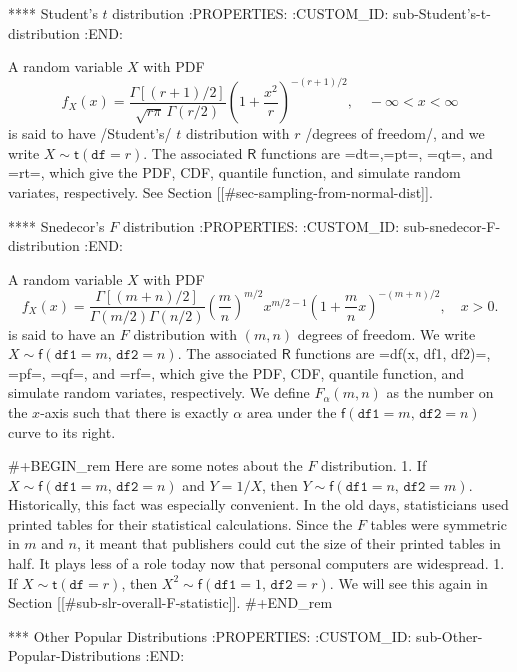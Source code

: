 **** Student's \(t\) distribution
:PROPERTIES:
:CUSTOM_ID: sub-Student's-t-distribution
:END:

A random variable \(X\) with PDF
\begin{equation}
f_{X}(x) = \frac{\Gamma\left[ (r+1)/2\right] }{\sqrt{r\pi}\,\Gamma(r/2)}\left( 1 + \frac{x^{2}}{r} \right)^{-(r+1)/2},\quad -\infty < x < \infty
\end{equation}
is said to have /Student's/ \(t\) distribution with \(r\) /degrees of
freedom/, and we write \(X\sim\mathsf{t}(\mathtt{df}=r)\). The
associated \(\mathsf{R}\) functions are =dt=,=pt=, =qt=, and =rt=,
which give the PDF, CDF, quantile function, and simulate random
variates, respectively. See Section [[#sec-sampling-from-normal-dist]].

**** Snedecor's \(F\) distribution
:PROPERTIES:
:CUSTOM_ID: sub-snedecor-F-distribution
:END:

A random variable \(X\) with PDF
\begin{equation}
f_{X}(x)=\frac{\Gamma[(m+n)/2]}{\Gamma(m/2)\Gamma(n/2)}\left(\frac{m}{n}\right)^{m/2}x^{m/2-1}\left(1+\frac{m}{n}x\right)^{-(m+n)/2},\quad x>0.
\end{equation}
is said to have an \(F\) distribution with \((m,n)\) degrees of
freedom. We write
\(X\sim\mathsf{f}(\mathtt{df1}=m,\,\mathtt{df2}=n)\). The associated
\(\mathsf{R}\) functions are =df(x, df1, df2)=, =pf=, =qf=, and =rf=,
which give the PDF, CDF, quantile function, and simulate random
variates, respectively. We define \(F_{\alpha}(m,n)\) as the number on
the \(x\)-axis such that there is exactly \(\alpha\) area under the
\(\mathsf{f}(\mathtt{df1}=m,\,\mathtt{df2}=n)\) curve to its right.

#+BEGIN_rem
Here are some notes about the \(F\) distribution.
1. If \(X\sim\mathsf{f}(\mathtt{df1}=m,\,\mathtt{df2}=n)\) and
   \(Y=1/X\), then
   \(Y\sim\mathsf{f}(\mathtt{df1}=n,\,\mathtt{df2}=m)\). Historically,
   this fact was especially convenient. In the old days, statisticians
   used printed tables for their statistical calculations. Since the
   \(F\) tables were symmetric in \(m\) and \(n\), it meant that
   publishers could cut the size of their printed tables in half. It
   plays less of a role today now that personal computers are
   widespread.
1. If \(X\sim\mathsf{t}(\mathtt{df}=r)\), then
   \(X^{2}\sim\mathsf{f}(\mathtt{df1}=1,\,\mathtt{df2}=r)\). We will
   see this again in Section [[#sub-slr-overall-F-statistic]].
#+END_rem

*** Other Popular Distributions
:PROPERTIES:
:CUSTOM_ID: sub-Other-Popular-Distributions
:END:

